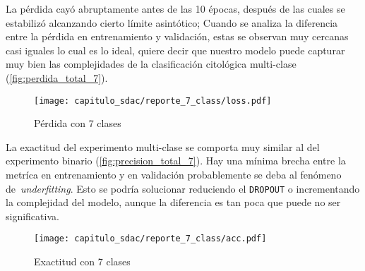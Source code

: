 \begin{table}[H]
    \centering
    \caption{Estadísticos del experimento multi-clase}
    \label{tabla:estadisticos7}
    \end{table}

La pérdida cayó abruptamente antes de las 10 épocas, después de las cuales se
estabilizó alcanzando cierto límite asintótico; Cuando se analiza la diferencia
entre la pérdida en entrenamiento y validación, estas se observan muy cercanas
casi iguales lo cual es lo ideal, quiere decir que nuestro modelo puede capturar
muy bien las complejidades de la clasificación citológica multi-clase
(\autoref{fig:perdida_total_7}).

\begin{figure}[H]
    \centering
    \texttt{[image: capitulo\_sdac/reporte\_7\_class/loss.pdf]}
    \caption{Pérdida con 7 clases}\label{fig:perdida_total_7}
\end{figure}

La exactitud del experimento multi-clase se comporta muy similar al del
experimento binario (\autoref{fig:precision_total_7}). Hay una mínima brecha
entre la metríca en entrenamiento y en validación probablemente se deba al
fenómeno de~\emph{underfitting}. Esto se podría solucionar reduciendo el
\texttt{DROPOUT} o incrementando la complejidad del modelo, aunque la
diferencia es tan poca que puede no ser significativa.

\begin{figure}[H]
    \centering
    \texttt{[image: capitulo\_sdac/reporte\_7\_class/acc.pdf]}
    \caption{Exactitud con 7 clases}\label{fig:precision_total_7}
\end{figure}


